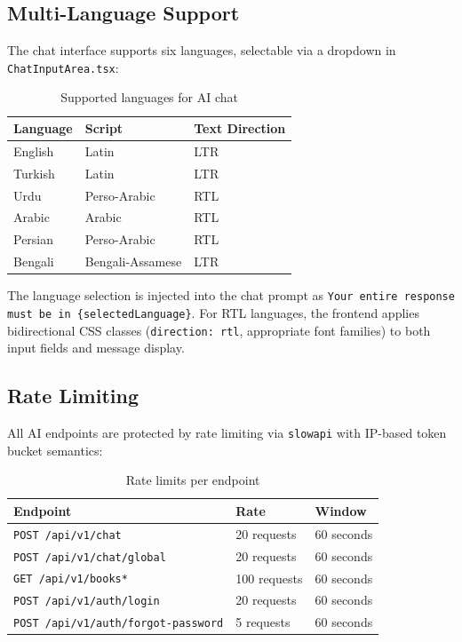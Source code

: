 \documentclass[11pt,a4paper]{article}
\begin{document}
\subsection{Multi-Language Support}

The chat interface supports six languages, selectable via a dropdown in \texttt{ChatInputArea.tsx}:

\begin{table}[H]
\centering
\begin{tabular}{@{}lll@{}}
\toprule
\textbf{Language} & \textbf{Script} & \textbf{Text Direction} \\
\midrule
English & Latin & LTR \\
Turkish & Latin & LTR \\
Urdu & Perso-Arabic & RTL \\
Arabic & Arabic & RTL \\
Persian & Perso-Arabic & RTL \\
Bengali & Bengali-Assamese & LTR \\
\bottomrule
\end{tabular}
\caption{Supported languages for AI chat}
\end{table}

The language selection is injected into the chat prompt as \texttt{Your entire response must be in \{selectedLanguage\}}. For RTL languages, the frontend applies bidirectional CSS classes (\texttt{direction: rtl}, appropriate font families) to both input fields and message display.

\subsection{Rate Limiting}

All AI endpoints are protected by rate limiting via \texttt{slowapi} with IP-based token bucket semantics:

\begin{table}[H]
\centering
\begin{tabular}{@{}lll@{}}
\toprule
\textbf{Endpoint} & \textbf{Rate} & \textbf{Window} \\
\midrule
\texttt{POST /api/v1/chat} & 20 requests & 60 seconds \\
\texttt{POST /api/v1/chat/global} & 20 requests & 60 seconds \\
\texttt{GET /api/v1/books*} & 100 requests & 60 seconds \\
\texttt{POST /api/v1/auth/login} & 20 requests & 60 seconds \\
\texttt{POST /api/v1/auth/forgot-password} & 5 requests & 60 seconds \\
\bottomrule
\end{tabular}
\caption{Rate limits per endpoint}
\end{table}
\end{document}
